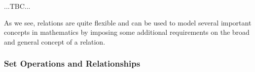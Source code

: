 ...TBC...



\medskip
As we see, relations are quite flexible and can be used to model several important concepts in mathematics by imposing some additional requirements on the broad and general concept of a relation.

\subsubsection{Set Operations and Relationships}

